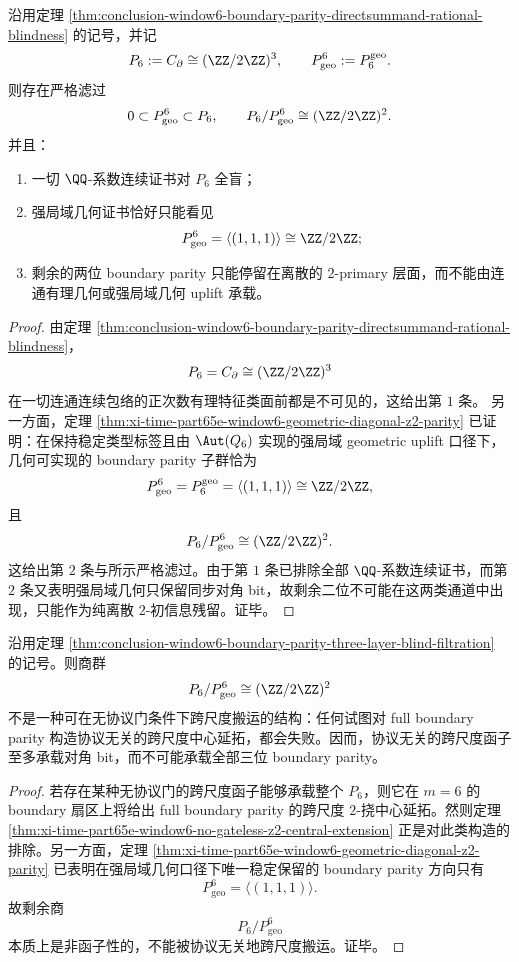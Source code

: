 \begin{theorem}\label{thm:conclusion-window6-boundary-parity-three-layer-blind-filtration}
沿用定理 \ref{thm:conclusion-window6-boundary-parity-directsummand-rational-blindness} 的记号，并记
\[
P_6:=C_{\partial}\cong (\ZZ/2\ZZ)^3,
\qquad
P_{\mathrm{geo}}^6:=P_6^{\mathrm{geo}}.
\]
则存在严格滤过
\[
0\subset P_{\mathrm{geo}}^6\subset P_6,
\qquad
P_6/P_{\mathrm{geo}}^6\cong (\ZZ/2\ZZ)^2.
\]
并且：
\begin{enumerate}
\normalfont
  \item 一切 \(\QQ\)-系数连续证书对 \(P_6\) 全盲；
  \item 强局域几何证书恰好只能看见
  \[
  P_{\mathrm{geo}}^6=\langle(1,1,1)\rangle\cong \ZZ/2\ZZ;
  \]
  \item 剩余的两位 boundary parity 只能停留在离散的 \(2\)-primary 层面，而不能由连通有理几何或强局域几何 uplift 承载。
\end{enumerate}
\end{theorem}
\begin{proof}
由定理 \ref{thm:conclusion-window6-boundary-parity-directsummand-rational-blindness}，
\[
P_6=C_{\partial}\cong (\ZZ/2\ZZ)^3
\]
在一切连通连续包络的正次数有理特征类面前都是不可见的，这给出第 \(1\) 条。
另一方面，定理 \ref{thm:xi-time-part65e-window6-geometric-diagonal-z2-parity} 已证明：在保持稳定类型标签且由 \(\Aut(Q_6)\) 实现的强局域 geometric uplift 口径下，几何可实现的 boundary parity 子群恰为
\[
P_{\mathrm{geo}}^6=P_6^{\mathrm{geo}}=\langle(1,1,1)\rangle\cong \ZZ/2\ZZ,
\]
且
\[
P_6/P_{\mathrm{geo}}^6\cong (\ZZ/2\ZZ)^2.
\]
这给出第 \(2\) 条与所示严格滤过。由于第 \(1\) 条已排除全部 \(\QQ\)-系数连续证书，而第 \(2\) 条又表明强局域几何只保留同步对角 bit，故剩余二位不可能在这两类通道中出现，只能作为纯离散 \(2\)-初信息残留。证毕。
\end{proof}

\begin{corollary}\label{cor:conclusion-window6-boundary-parity-residual-two-bits-nonfunctorial}
沿用定理 \ref{thm:conclusion-window6-boundary-parity-three-layer-blind-filtration} 的记号。则商群
\[
P_6/P_{\mathrm{geo}}^6\cong (\ZZ/2\ZZ)^2
\]
不是一种可在无协议门条件下跨尺度搬运的结构：任何试图对 full boundary parity 构造协议无关的跨尺度中心延拓，都会失败。因而，协议无关的跨尺度函子至多承载对角 bit，而不可能承载全部三位 boundary parity。
\end{corollary}
\begin{proof}
若存在某种无协议门的跨尺度函子能够承载整个 \(P_6\)，则它在 \(m=6\) 的 boundary 扇区上将给出 full boundary parity 的跨尺度 \(2\)-挠中心延拓。然则定理 \ref{thm:xi-time-part65e-window6-no-gateless-z2-central-extension} 正是对此类构造的排除。另一方面，定理 \ref{thm:xi-time-part65e-window6-geometric-diagonal-z2-parity} 已表明在强局域几何口径下唯一稳定保留的 boundary parity 方向只有
\[
P_{\mathrm{geo}}^6=\langle(1,1,1)\rangle.
\]
故剩余商
\[
P_6/P_{\mathrm{geo}}^6
\]
本质上是非函子性的，不能被协议无关地跨尺度搬运。证毕。
\end{proof}

